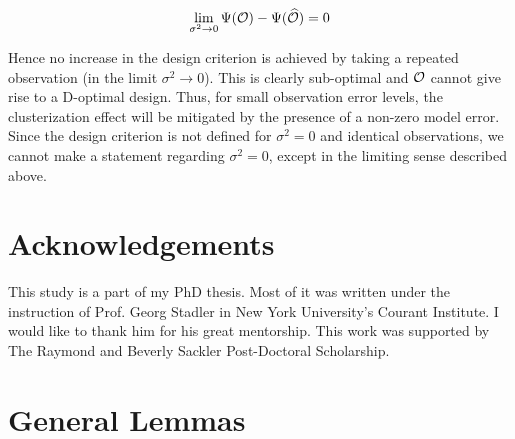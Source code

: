 \documentclass{amsart}
\numberwithin{equation}{section}
\begin{document}
$$
\lim_{\sigma^2 \to 0} \Psi(\mathcal{O}) -\Psi(\widehat{\mathcal{O}}) = 0
$$

Hence no increase in the design criterion is achieved by taking a
repeated observation (in the limit $\sigma^2 \to 0$). This is clearly
sub-optimal and $\mathcal{O}$ cannot give rise to a D-optimal design. Thus,
for small observation error levels, the clusterization effect will be
mitigated by the presence of a non-zero model error. Since the design
criterion is not defined for $\sigma^2 = 0$ and identical
observations, we cannot make a statement regarding $\sigma^2 = 0$,
except in the limiting sense described above.


\section{Acknowledgements}
This study is a part of my PhD thesis. Most of it was written under
the instruction of Prof. Georg Stadler in New York University's
Courant Institute. I would like to thank him for his great
mentorship. This work was supported by The Raymond and Beverly Sackler
Post-Doctoral Scholarship.

\appendix
\section{General Lemmas}
\end{document}
